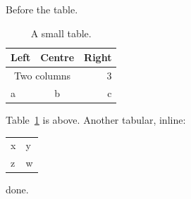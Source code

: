 \documentclass{article}
\begin{document}
Before the table.
\begin{table}[h]
\centering
\begin{tabular}{|l|c|r|}
\hline
Left & Centre & Right \\
\hline
\multicolumn{2}{|c|}{Two columns} & 3 \\
a & b & c \\
\hline
\end{tabular}
\caption{A small table.}\label{tab:small}
\end{table}
Table~\ref{tab:small} is above. Another tabular, inline:
\begin{tabular}{ll}
x & y \\ z & w
\end{tabular}
done.
\end{document}

